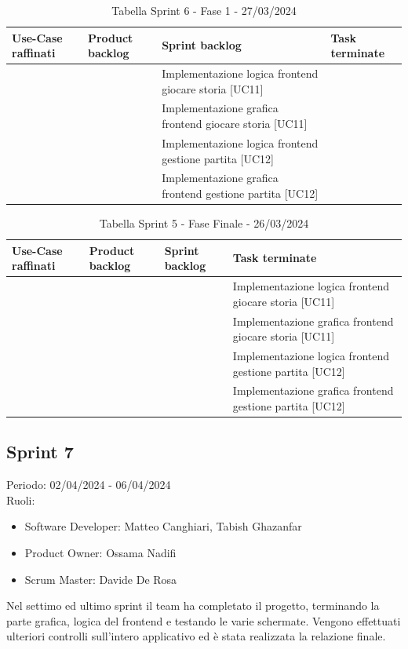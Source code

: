 \documentclass{article}
\begin{document}
\begin{table}[h]
    \centering
    \begin{tabularx}{\textwidth}{|X|X|X|X|}
        \hline
        \bf Use-Case raffinati & \bf Product backlog & \bf Sprint backlog & \bf Task terminate \\
        \hline
        & & Implementazione logica frontend giocare storia [UC11] & \\
        \hline
        & & Implementazione grafica frontend giocare storia [UC11] & \\
        \hline
        & & Implementazione logica frontend gestione partita [UC12] & \\
        \hline
        & & Implementazione grafica frontend gestione partita [UC12] & \\
        \hline
    \end{tabularx}
    \caption*{Tabella Sprint 6 - Fase 1 - 27/03/2024}
\end{table}

\begin{table}[h]
    \centering
    \begin{tabularx}{\textwidth}{|X|X|X|X|}
        \hline
        \bf Use-Case raffinati & \bf Product backlog & \bf Sprint backlog & \bf Task terminate \\
        \hline
        & & & Implementazione logica frontend giocare storia [UC11] \\
        \hline
        & & & Implementazione grafica frontend giocare storia [UC11] \\
        \hline
        & & & Implementazione logica frontend gestione partita [UC12] \\
        \hline
        & & & Implementazione grafica frontend gestione partita [UC12] \\
        \hline
    \end{tabularx}
    \caption*{Tabella Sprint 5 - Fase Finale - 26/03/2024}
\end{table}

\clearpage
\subsection*{Sprint 7}
Periodo: 02/04/2024 - 06/04/2024\vspace*{7pt}\\
Ruoli:
\begin{itemize}[label = { }]
    \itemsep0em
    \item Software Developer: Matteo Canghiari, Tabish Ghazanfar 
    \item Product Owner: Ossama Nadifi 
    \item Scrum Master: Davide De Rosa
\end{itemize}
Nel settimo ed ultimo sprint il team ha completato il progetto, terminando la parte grafica, logica del frontend e testando le varie schermate. Vengono effettuati ulteriori controlli sull'intero applicativo ed è stata realizzata la relazione finale.
\end{document}
